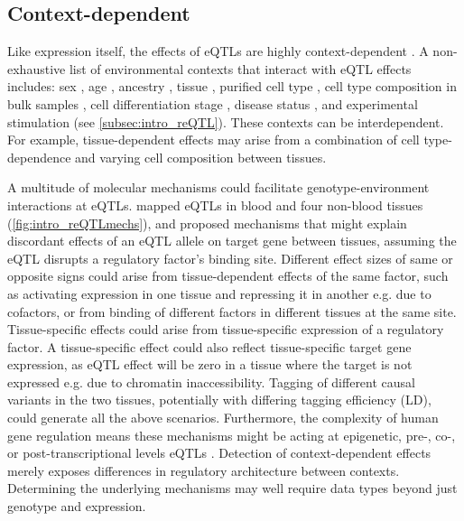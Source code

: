 \begin{outline}
\subsection{Context-dependent }

Like expression itself, the effects of \glspl{eQTL} are highly context-dependent \autocite{albert2015RoleRegulatoryVariation,vandiedonck2017GeneticAssociationMolecular}.
A non-exhaustive list of environmental contexts that interact with \gls{eQTL} effects includes:
    sex \autocite{yao2014SexAgeinteractingEQTLs},
    age \autocite{yao2014SexAgeinteractingEQTLs},
    ancestry \autocite{dejager2015ImmVarProjectInsights,nedelec2016GeneticAncestryNatural,quach2017LivingAdaptiveWorld},
    tissue \autocite{nica2011ArchitectureGeneRegulatory,aguet2017GeneticEffectsGene},
    purified cell type \autocite{dimas2009CommonRegulatoryVariation,dejager2015ImmVarProjectInsights,peters2016InsightGenotypePhenotypeAssociations,chen2016GeneticDriversEpigenetic,calderon2019LandscapeStimulationresponsiveChromatin},
    cell type composition in bulk samples \autocite{westra2015CellSpecificEQTL,zhernakova2017IdentificationContextdependentExpression,glastonbury2019CellTypeHeterogeneityAdipose,kim-hellmuth2020CellTypeSpecific},
    cell differentiation stage \autocite{strober2019DynamicGeneticRegulation},
    disease status \autocite{peters2016InsightGenotypePhenotypeAssociations},
    and experimental stimulation (see \cref{subsec:intro_reQTL}).
These contexts can be interdependent.
For example, tissue-dependent effects may arise from a combination of cell type-dependence and varying cell composition between tissues.

A multitude of molecular mechanisms could facilitate genotype-environment interactions at \glspl{eQTL}.
\textcite{fu2012UnravelingRegulatoryMechanisms} mapped \glspl{eQTL} in blood and four non-blood tissues (\autoref{fig:intro_reQTLmechs}), 
and proposed mechanisms that might explain discordant effects of an \gls{eQTL} allele on target gene between tissues,
assuming the \gls{eQTL} disrupts a regulatory factor's binding site.
Different effect sizes of same or opposite signs could arise 
from tissue-dependent effects of the same factor, such as activating expression in one tissue and repressing it in another e.g. due to cofactors,
or from binding of different factors in different tissues at the same site.
Tissue-specific effects could arise from tissue-specific expression of a regulatory factor.
A tissue-specific effect could also reflect tissue-specific target gene expression,
as \gls{eQTL} effect will be zero in a tissue where the target is not expressed e.g. due to chromatin inaccessibility.
Tagging of different causal variants in the two tissues, potentially with differing tagging efficiency (\gls{LD}), could generate all the above scenarios.
Furthermore, the complexity of human gene regulation means these mechanisms might be acting at epigenetic, pre-, co-, or post-transcriptional levels \glspl{eQTL} \autocite{gaffney2013GlobalPropertiesFunctional}.
Detection of context-dependent effects merely exposes differences in regulatory architecture between contexts.
Determining the underlying mechanisms may well require data types beyond just genotype and expression.


\end{outline}
